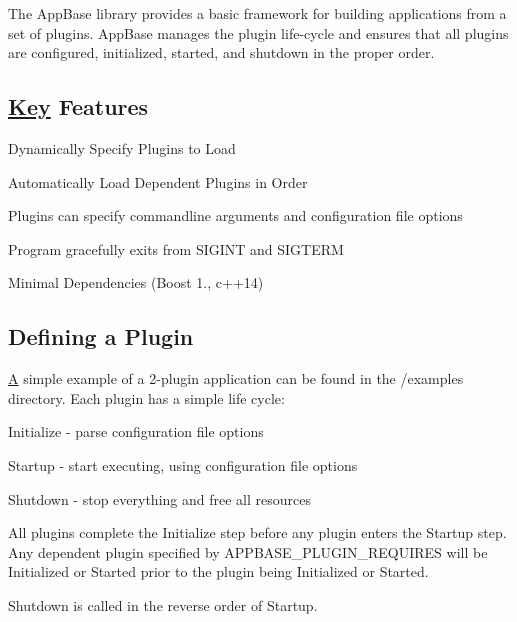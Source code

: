 The App\+Base library provides a basic framework for building applications from a set of plugins. App\+Base manages the plugin life-\/cycle and ensures that all plugins are configured, initialized, started, and shutdown in the proper order.

\subsection*{\mbox{\hyperlink{struct_key}{Key}} Features}


\begin{DoxyItemize}
\item Dynamically Specify Plugins to Load
\item Automatically Load Dependent Plugins in Order
\item Plugins can specify commandline arguments and configuration file options
\item Program gracefully exits from S\+I\+G\+I\+NT and S\+I\+G\+T\+E\+RM
\item Minimal Dependencies (Boost 1., c++14)
\end{DoxyItemize}

\subsection*{Defining a Plugin}

\mbox{\hyperlink{struct_a}{A}} simple example of a 2-\/plugin application can be found in the /examples directory. Each plugin has a simple life cycle\+:


\begin{DoxyEnumerate}
\item Initialize -\/ parse configuration file options
\item Startup -\/ start executing, using configuration file options
\item Shutdown -\/ stop everything and free all resources
\end{DoxyEnumerate}

All plugins complete the Initialize step before any plugin enters the Startup step. Any dependent plugin specified by {\ttfamily A\+P\+P\+B\+A\+S\+E\+\_\+\+P\+L\+U\+G\+I\+N\+\_\+\+R\+E\+Q\+U\+I\+R\+ES} will be Initialized or Started prior to the plugin being Initialized or Started.

Shutdown is called in the reverse order of Startup.


